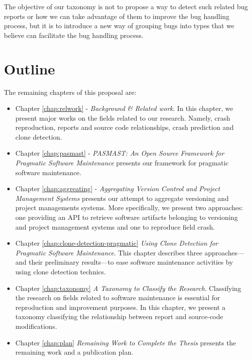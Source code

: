 The objective of our taxonomy is not to propose a way to
detect such related bug reports or how we can take advantage
of them to improve the bug handling process, but it is to
introduce a new way of grouping bugs into types that we
believe can facilitate the bug handling process.

\section{Outline\label{sec:outline}}

The remaining chapters of this proposal are:

\begin{itemize}
	\item Chapter \ref{chap:relwork} - {\it Background \& Related work}.
	In this chapter, we present major works on the fields related to our research. Namely, crash reproduction, reports and source code relationships, crash prediction and clone detection.
	\item Chapter \ref{chap:pasmast} - {\it PASMAST: An Open Source Framework for Pragmatic Software Maintenance} presents our framework for pragmatic software maintenance.
	\item Chapter \ref{chap:aggreating} - {\it Aggregating Version Control and Project Management Systems} presents our attempt to aggregate versioning and project managements systems.
	More specifically, we present two approaches: one providing an API to retrieve software artifacts belonging to versioning and project management systems and one to reproduce field crash.
	\item Chapter \ref{chap:clone-detection-pragmatic} {\it Using Clone Detection for Pragmatic Software Maintenance}.
	This chapter describes three approaches---and their preliminary results---to ease software maintenance activities by using clone detection technics.
	\item Chapter \ref{chap:taxonomy} {\it A Taxonomy to Classify the Research}. Classifying the research on fields related to software maintenance is essential for reproduction and improvement purposes.
	In this chapter, we present a taxonomy classifying the relationship between report and source-code modifications.
	\item Chapter \ref{chap:plan} {\it Remaining Work to Complete the
Thesis} presents  the remaining work and a publication plan.
\end{itemize}
